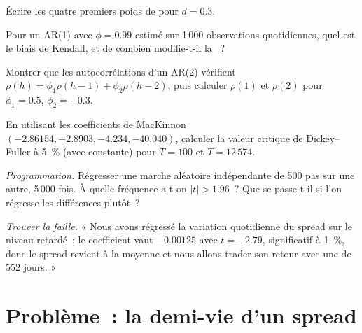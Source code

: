 \begin{exercise}[$\star$]\label{exo:qm:linear-time-series:3}
Écrire les quatre premiers poids de  pour $d = 0.3$.
\end{exercise}

\begin{exercise}[$\star\star$]\label{exo:qm:linear-time-series:4}
Pour un AR(1) avec $\phi = 0.99$ estimé sur 1\,000 observations quotidiennes, quel est le biais de Kendall, et de combien modifie-t-il la ~?
\end{exercise}

\begin{exercise}[$\star\star$]\label{exo:qm:linear-time-series:5}
Montrer que les autocorrélations d'un AR(2) vérifient $\rho(h) = \phi_1\rho(h - 1) + \phi_2\rho(h - 2)$, puis calculer $\rho(1)$ et $\rho(2)$ pour $\phi_1 = 0.5$, $\phi_2 =
-0.3$.
\end{exercise}

\begin{exercise}[$\star\star$]\label{exo:qm:linear-time-series:6}
En utilisant les coefficients de MacKinnon $(-2.86154, -2.8903, -4.234, -40.040)$, calculer la valeur critique de Dickey--Fuller à 5~\% (avec constante) pour $T = 100$ et $T = 12\,574$.
\end{exercise}

\begin{exercise}[$\star\star\star$]\label{exo:qm:linear-time-series:7}
\emph{Programmation.} Régresser une marche aléatoire indépendante de 500 pas sur une autre, 5\,000 fois. À quelle fréquence a-t-on $|t| > 1.96$~? Que se passe-t-il si l'on régresse les différences
plutôt~?
\end{exercise}

\begin{exercise}[$\star\star\star$]\label{exo:qm:linear-time-series:8}
\emph{Trouver la faille.} « Nous avons régressé la variation quotidienne du spread sur le niveau retardé~; le coefficient vaut $-0.00125$ avec $t = -2.79$, significatif à 1~\%, donc le
spread revient à la moyenne et nous allons trader son retour avec une  de 552 jours. »
\end{exercise}

\section{Problème~: la demi-vie d'un spread}

